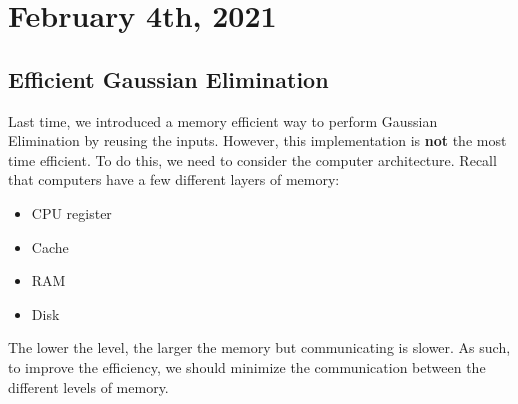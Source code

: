 \documentclass[../main/main.tex]{subfiles}
\begin{document}
\section{February 4th, 2021}
\subsection{Efficient Gaussian Elimination}
Last time, we introduced a memory efficient way to perform Gaussian Elimination by reusing the inputs. However, this implementation is \textbf{not} the most time efficient. To do this, we need to consider the computer architecture. Recall that computers have a few different layers of memory:
\begin{itemize}
  \item CPU register
  \item Cache
  \item RAM
  \item Disk
\end{itemize}
The lower the level, the larger the memory but communicating is slower. As such, to improve the efficiency, we should minimize the communication between the different levels of memory.
\end{document}
